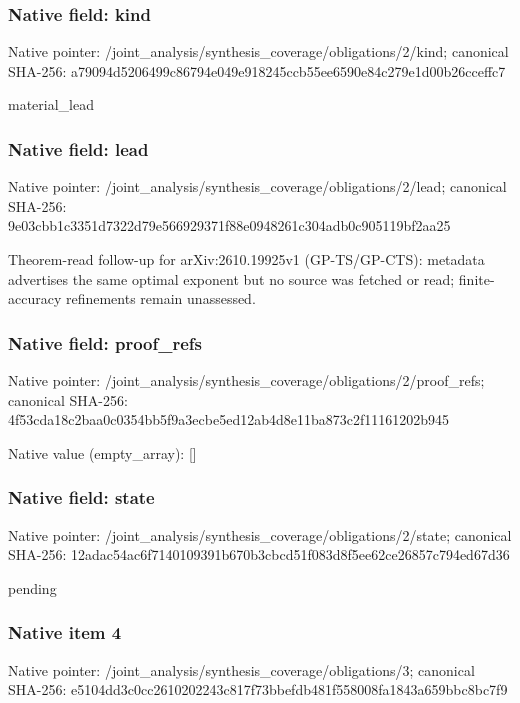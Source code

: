 \documentclass[10pt,a4paper]{article}
\begin{document}
\subsubsection{Native field: kind}
Native pointer: /joint\_\allowbreak{}analysis/synthesis\_\allowbreak{}coverage/obligations/2/kind; canonical SHA-256: a79094d5206499c86794e049e918245ccb55ee6590e84c279e1d00b26cceffc7

\begingroup\raggedright\sloppy material\_\allowbreak{}lead\par\endgroup

\subsubsection{Native field: lead}
Native pointer: /joint\_\allowbreak{}analysis/synthesis\_\allowbreak{}coverage/obligations/2/lead; canonical SHA-256: 9e03cbb1c3351d7322d79e566929371f88e0948261c304adb0c905119bf2aa25

\begingroup\raggedright\sloppy Theorem-read follow-up for arXiv:\allowbreak{}2610.19925v1 (GP-TS/\allowbreak{}GP-CTS):\allowbreak{} metadata advertises the same optimal exponent but no source was fetched or read;\allowbreak{} finite-accuracy refinements remain unassessed.\par\endgroup

\subsubsection{Native field: proof\_\allowbreak{}refs}
Native pointer: /joint\_\allowbreak{}analysis/synthesis\_\allowbreak{}coverage/obligations/2/proof\_\allowbreak{}refs; canonical SHA-256: 4f53cda18c2baa0c0354bb5f9a3ecbe5ed12ab4d8e11ba873c2f11161202b945

Native value (empty\_\allowbreak{}array): []

\subsubsection{Native field: state}
Native pointer: /joint\_\allowbreak{}analysis/synthesis\_\allowbreak{}coverage/obligations/2/state; canonical SHA-256: 12adac54ac6f7140109391b670b3cbcd51f083d8f5ee62ce26857c794ed67d36

\begingroup\raggedright\sloppy pending\par\endgroup

\subsubsection{Native item 4}
Native pointer: /joint\_\allowbreak{}analysis/synthesis\_\allowbreak{}coverage/obligations/3; canonical SHA-256: e5104dd3c0cc2610202243c817f73bbefdb481f558008fa1843a659bbc8bc7f9
\end{document}
